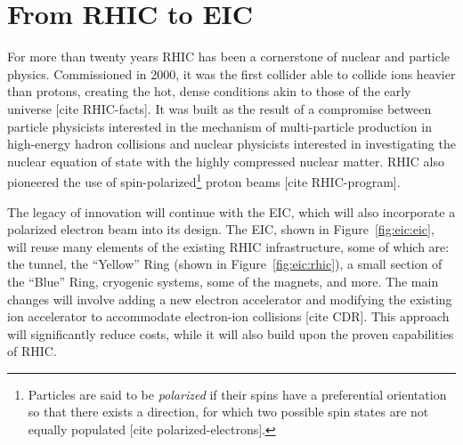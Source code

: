 \section{From RHIC to EIC}
For more than twenty years RHIC has been a cornerstone of nuclear and particle physics. Commissioned in 2000, it was the first collider able to collide ions heavier than protons, creating the hot, dense conditions akin to those of the early universe [cite RHIC-facts]. It was built as the result of a compromise between particle physicists interested in the mechanism of multi-particle production in high-energy hadron collisions and nuclear physicists interested in investigating the nuclear equation of state with the highly compressed nuclear matter. RHIC also pioneered the use of spin-polarized\footnote{Particles are said to be \emph{polarized} if their spins have a preferential orientation so that there exists a direction, for which two possible spin states are not equally populated [cite polarized-electrons].} proton beams [cite RHIC-program].

The legacy of innovation will continue with the EIC, which will also incorporate a polarized electron beam into its design. The EIC, shown in Figure~\ref{fig:eic:eic}, will reuse many elements of the existing RHIC infrastructure, some of which are: the tunnel, the \enquote{Yellow} Ring (shown in Figure~\ref{fig:eic:rhic}), a small section of the \enquote{Blue} Ring, cryogenic systems, some of the magnets, and more. The main changes will involve adding a new electron accelerator and modifying the existing ion accelerator to accommodate electron-ion collisions [cite CDR]. This approach will significantly reduce costs, while it will also build upon the proven capabilities of RHIC.

